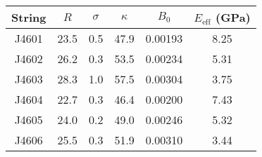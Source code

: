 \begin{tabular}{cccccc}
\toprule
String & $R$ & $\sigma$ & $\kappa$ & $B_0$ & $E_\mathrm{eff}$ (GPa) \\
\midrule
J4601 & 23.5 & 0.5 & 47.9 & 0.00193 & 8.25 \\
J4602 & 26.2 & 0.3 & 53.5 & 0.00234 & 5.31 \\
J4603 & 28.3 & 1.0 & 57.5 & 0.00304 & 3.75 \\
J4604 & 22.7 & 0.3 & 46.4 & 0.00200 & 7.43 \\
J4605 & 24.0 & 0.2 & 49.0 & 0.00246 & 5.32 \\
J4606 & 25.5 & 0.3 & 51.9 & 0.00310 & 3.44 \\
\bottomrule
\end{tabular}
